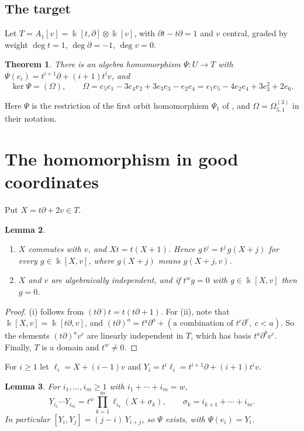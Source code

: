 \documentclass[11pt]{amsart}
\newtheorem{theorem}{Theorem}[section]
\newtheorem{lemma}[theorem]{Lemma}
\theoremstyle{definition}
\theoremstyle{remark}
\newcommand{\U}{U}
\newcommand{\kk}{\Bbbk}
\begin{document}
\subsection*{The target}
Let $T=A_1[v]=\kk[t,\partial]\otimes\kk[v]$, with $\partial t-t\partial=1$ and $v$ central, graded by weight $\deg t=1$, $\deg\partial=-1$, $\deg v=0$.

\begin{theorem}\label{thm:main}
There is an algebra homomorphism $\Psi:\U\to T$ with $\Psi(e_i)=t^{i+1}\partial+(i+1)t^iv$, and
\[
\ker\Psi=(\Omega),\qquad \Omega=e_5e_1-3e_4e_2+3e_3e_3-e_2e_4=e_1e_5-4e_2e_4+3e_3^2+2e_6 .
\]
\end{theorem}

Here $\Psi$ is the restriction of the first orbit homomorphism $\Psi_1$ of \cite{PT}, and $\Omega=\Omega^{(3)}_{5,1}$ in their notation.

\section{The homomorphism in good coordinates}

Put $X=t\partial+2v\in T$.

\begin{lemma}\label{lem:coords}
\begin{enumerate}[label=\textup{(\roman*)}]
\item $X$ commutes with $v$, and $Xt=t(X+1)$. Hence $g\,t^j=t^j\,g(X+j)$ for every $g\in\kk[X,v]$, where $g(X+j)$ means $g(X+j,v)$.
\item $X$ and $v$ are algebraically independent, and if $t^wg=0$ with $g\in\kk[X,v]$ then $g=0$.
\end{enumerate}
\end{lemma}

\begin{proof}
(i) follows from $(t\partial)t=t(t\partial+1)$. For (ii), note that $\kk[X,v]=\kk[t\partial,v]$, and $(t\partial)^a=t^a\partial^a+(\text{a combination of }t^c\partial^c,\ c<a)$. So the elements $(t\partial)^av^c$ are linearly independent in $T$, which has basis $t^a\partial^bv^c$. Finally, $T$ is a domain and $t^w\neq0$.
\end{proof}

For $i\ge1$ let $\ell_i=X+(i-1)v$ and $Y_i=t^i\ell_i=t^{i+1}\partial+(i+1)t^iv$.

\begin{lemma}\label{lem:formula}
For $i_1,\dots,i_m\ge1$ with $i_1+\cdots+i_m=w$,
\begin{equation}\label{eq:formula}
Y_{i_1}\cdots Y_{i_m}=t^w\prod_{k=1}^m\ell_{i_k}(X+\sigma_k),\qquad \sigma_k=i_{k+1}+\cdots+i_m .
\end{equation}
In particular $[Y_i,Y_j]=(j-i)\,Y_{i+j}$, so $\Psi$ exists, with $\Psi(e_i)=Y_i$.
\end{lemma}
\end{document}
